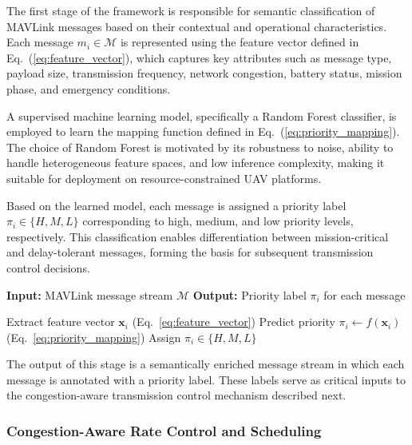 \documentclass[pdflatex,sn-mathphys-num]{sn-jnl}%
\theoremstyle{thmstyleone}%
\theoremstyle{thmstyletwo}%
\theoremstyle{thmstylethree}%
\begin{document}
The first stage of the framework is responsible for semantic classification of MAVLink messages based on their contextual and operational characteristics. Each message $m_i \in \mathcal{M}$ is represented using the feature vector defined in Eq.~(\ref{eq:feature_vector}), which captures key attributes such as message type, payload size, transmission frequency, network congestion, battery status, mission phase, and emergency conditions.

A supervised machine learning model, specifically a Random Forest classifier, is employed to learn the mapping function defined in Eq.~(\ref{eq:priority_mapping}). The choice of Random Forest is motivated by its robustness to noise, ability to handle heterogeneous feature spaces, and low inference complexity, making it suitable for deployment on resource-constrained UAV platforms.

Based on the learned model, each message is assigned a priority label $\pi_i \in \{H, M, L\}$ corresponding to high, medium, and low priority levels, respectively. This classification enables differentiation between mission-critical and delay-tolerant messages, forming the basis for subsequent transmission control decisions.

\begin{algorithm}[H]
\caption{Machine Learning-Based Message Priority Classification}
\begin{algorithmic}[1]
\State \textbf{Input:} MAVLink message stream $\mathcal{M}$
\State \textbf{Output:} Priority label $\pi_i$ for each message

    \State Extract feature vector $\mathbf{x}_i$ (Eq.~\ref{eq:feature_vector})
    \State Predict priority $\pi_i \leftarrow f(\mathbf{x}_i)$ (Eq.~\ref{eq:priority_mapping})
    \State Assign $\pi_i \in \{H, M, L\}$
\EndFor

\end{algorithmic}
\end{algorithm}

The output of this stage is a semantically enriched message stream in which each message is annotated with a priority label. These labels serve as critical inputs to the congestion-aware transmission control mechanism described next.

\subsubsection{ Congestion-Aware Rate Control and Scheduling }
\end{document}
